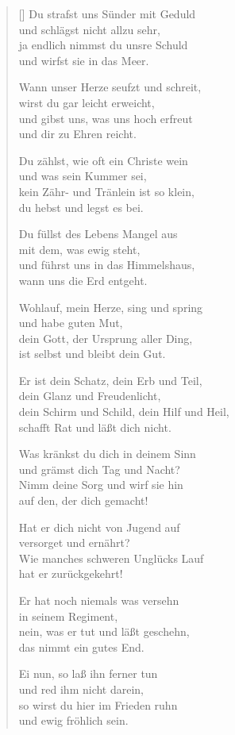 \begin{multicols}{2}
\begin{verse}[\versewidth]
 Du strafst uns Sünder mit Geduld\\
und schlägst nicht allzu sehr,\\
ja endlich nimmst du unsre Schuld\\
und wirfst sie in das Meer.

 Wann unser Herze seufzt und schreit,\\
wirst du gar leicht erweicht,\\
und gibst uns, was uns hoch erfreut\\
und dir zu Ehren reicht.

 Du zählst, wie oft ein Christe wein\\
und was sein Kummer sei,\\
kein Zähr- und Tränlein ist so klein,\\
du hebst und legst es bei.

 Du füllst des Lebens Mangel aus\\
mit dem, was ewig steht,\\
und führst uns in das Himmelshaus,\\
wann uns die Erd entgeht.

 Wohlauf, mein Herze, sing und spring\\
und habe guten Mut,\\
dein Gott, der Ursprung aller Ding,\\
ist selbst und bleibt dein Gut.

 Er ist dein Schatz, dein Erb und Teil,\\
dein Glanz und Freudenlicht,\\
dein Schirm und Schild, dein Hilf und Heil,\\
schafft Rat und läßt dich nicht.

 Was kränkst du dich in deinem Sinn\\
und grämst dich Tag und Nacht?\\
Nimm deine Sorg und wirf sie hin\\
auf den, der dich gemacht!

 Hat er dich nicht von Jugend auf\\
versorget und ernährt?\\
Wie manches schweren Unglücks Lauf\\
hat er zurückgekehrt!

 Er hat noch niemals was versehn\\
in seinem Regiment,\\
nein, was er tut und läßt geschehn,\\
das nimmt ein gutes End.

 Ei nun, so laß ihn ferner tun\\
und red ihm nicht darein,\\
so wirst du hier im Frieden ruhn\\
und ewig fröhlich sein.

\end{verse}
\end{multicols}
